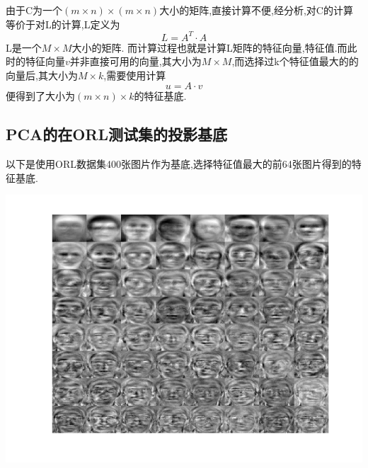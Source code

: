 由于C为一个$(m \times n) \times (m \times n)$大小的矩阵,直接计算不便,经分析,对C的计算等价于对L的计算,L定义为
\begin{equation}
	L = A^T \cdot A
\end{equation}
L是一个$M \times M$大小的矩阵.
而计算过程也就是计算L矩阵的特征向量,特征值.而此时的特征向量$v$并非直接可用的向量,其大小为$M \times M$,而选择过k个特征值最大的的向量后,其大小为$M \times k$,需要使用计算
	\begin{equation}
		u=A \cdot v
	\end{equation} 
	便得到了大小为$(m \times n) \times k$的特征基底.
	
\subsection{PCA的在ORL测试集的投影基底}
以下是使用ORL数据集400张图片作为基底,选择特征值最大的前64张图片得到的特征基底.
\begin{center}
\begin{minipage}[t]{\linewidth}
\center
{
\includegraphics[width=\textwidth]{Img/pca_base.png} 
}
\end{minipage}
\medskip
\end{center}

